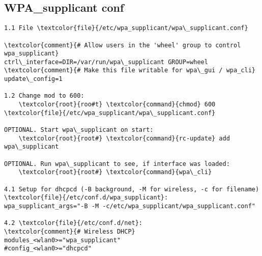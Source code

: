 \documentclass[10pt, a4paper, onecolumn, openany]{book}         %
\begin{document}
\subsection{WPA\_supplicant conf}
\begin{Verbatim}[commandchars=\\\{\}]
1.1 File \textcolor{file}{/etc/wpa_supplicant/wpa\_supplicant.conf}

\textcolor{comment}{# Allow users in the 'wheel' group to control wpa_supplicant}
ctrl\_interface=DIR=/var/run/wpa\_supplicant GROUP=wheel
\textcolor{comment}{# Make this file writable for wpa\_gui / wpa_cli}
update\_config=1

1.2 Change mod to 600:
    \textcolor{root}{roo#t} \textcolor{command}{chmod} 600 \textcolor{file}{/etc/wpa_supplicant/wpa\_supplicant.conf}

OPTIONAL. Start wpa\_supplicant on start:
    \textcolor{root}{root#} \textcolor{command}{rc-update} add wpa\_supplicant
    
OPTIONAL. Run wpa\_supplicant to see, if interface was loaded:
    \textcolor{root}{root#} \textcolor{command}{wpa\_cli}
    
4.1 Setup for dhcpcd (-B background, -M for wireless, -c for filename)
\textcolor{file}{/etc/conf.d/wpa_supplicant}:
wpa_supplicant_args="-B -M -c/etc/wpa_supplicant/wpa_supplicant.conf"

4.2 \textcolor{file}{/etc/conf.d/net}:
\textcolor{comment}{# Wireless DHCP}
modules_<wlan0>="wpa_supplicant"
#config_<wlan0>="dhcpcd"
\end{Verbatim}
\end{document}
